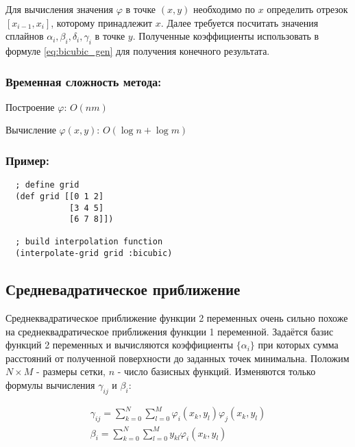 Для вычисления значения $\varphi$ в точке $(x,y)$ необходимо по $x$ определить отрезок $[x_{i-1}, x_i]$, которому принадлежит $x$. Далее требуется посчитать значения сплайнов $\alpha_i, \beta_i, \delta_i, \gamma_i$ в точке $y$. Полученные коэффициенты использовать в формуле \eqref{eq:bicubic_gen} для получения конечного результата.

\subsubsection{Временная сложность метода:}

Построение $\varphi$: $O(n m)$

Вычисление $\varphi(x, y)$: $O(\log{n} + \log{m})$

\subsubsection{Пример:}

\begin{verbatim}
  ; define grid
  (def grid [[0 1 2]
             [3 4 5]
             [6 7 8]])

  ; build interpolation function
  (interpolate-grid grid :bicubic)
\end{verbatim}


\subsection{Средневадратическое приближение}

Среднеквадратическое приближение функции 2 переменных очень сильно похоже на среднеквадратическое приближения функции 1 переменной. Задаётся базис функций 2 переменных и вычисляются коэффициенты $\{\alpha_i\}$ при которых сумма расстояний от полученной поверхности до заданных точек минимальна. Положим $N \times M$ - размеры сетки, $n$ - число базисных функций. Изменяются только формулы вычисления $\gamma_{ij}$ и $\beta_i$:

\begin{equation}
  \begin{gathered}
    \gamma_{ij} = \sum^N_{k=0}\sum^M_{l=0} \varphi_i(x_k,y_l) \varphi_j(x_k,y_l) \\
    \beta_i = \sum^N_{k=0}\sum^M_{l=0} y_{kl} \varphi_i(x_k,y_l)
  \end{gathered}
\end{equation}

